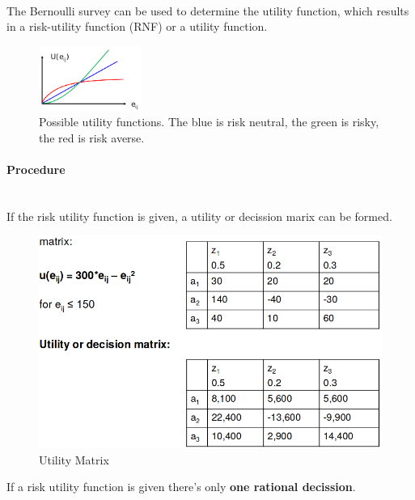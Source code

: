 \mbox{}\\
The Bernoulli survey can be used to determine the utility function,
which results in a risk-utility function (RNF) or a utility function.


\begin{figure}[H]
\centering
\includegraphics[width=0.3\textwidth]{figures/utilityFunction.png}
\caption{Possible utility functions. The blue is risk neutral, the green is risky, the red is risk averse.}
\end{figure}

\paragraph{Procedure}
\mbox{}\\
If the risk utility function is given, a utility or decission marix can
be formed.

\begin{figure}[H]
\centering
\includegraphics[width=.5\textwidth]{figures/utilitymatrix.png}
\caption{Utility Matrix}
\end{figure}

If a risk utility function is given there's only \textbf{one rational
decission}.
